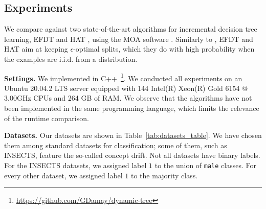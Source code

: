 

\subsection{Experiments}
We compare \algo{} against two state-of-the-art algorithms for incremental decision tree learning, EFDT \cite{Manapragada2018_EFDT} and HAT \cite{bifet2009_AdaptiveLearning}, using the MOA software \cite{Bifet2010_MOA}. Similarly to \algo{}, EFDT and HAT aim at keeping $\epsilon$-optimal splits, which they do with high probability when the examples are i.i.d. from a distribution.

\noindent\textbf{Settings.} We implemented \algo{} in C++~\footnote{\url{https://github.com/GDamay/dynamic-tree}}. We conducted all experiments on an Ubuntu 20.04.2 LTS server equipped with 144 Intel(R) Xeon(R) Gold 6154 @ 3.00GHz CPUs and 264 GB of RAM. We observe that the algorithms have not been implemented in the same programming language, which limits the relevance of the runtime comparison.

\noindent\textbf{Datasets.} Our datasets are shown in Table~\ref{tab:datasets_table}. We have chosen them among standard datasets for classification; some of them, such as INSECTS, feature the so-called concept drift. Not all datasets have binary labels. For the INSECTS datasets, we assigned label $1$ to  the union of \texttt{male} classes. For every other dataset, we assigned label $1$ to the majority class. %


